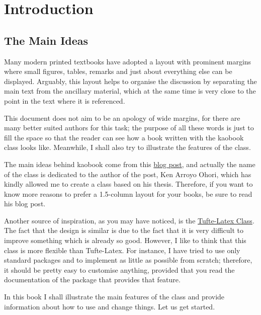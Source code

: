 \setchapterpreamble[u]{\margintoc}
\chapter{Introduction}

\section{The Main Ideas}

Many modern printed textbooks have adopted a layout with prominent
margins where small figures, tables, remarks and just about everything
else can be displayed. Arguably, this layout helps to organise the
	discussion by separating the main text from the ancillary material,
	which at the same time is very close to the point in the text where
	it is referenced.

This document does not aim to be an apology of wide margins, for there
are many better suited authors for this task; the purpose of all these
words is just to fill the space so that the reader can see how a book
written with the kaobook class looks like. Meanwhile, I shall also try
to illustrate the features of the class.

The main ideas behind kaobook come from this
\href{https://3d.bk.tudelft.nl/ken/en/2016/04/17/a-1.5-column-layout-in-latex.html}{blog
	post}, and actually the name of the class is dedicated to the author
of the post, Ken Arroyo Ohori, which has kindly allowed me to create a
class based on his thesis. Therefore, if you want to know more reasons
to prefer a 1.5-column layout for your books, be sure to read his blog
post.

Another source of inspiration, as you may have noticed, is the
\href{https://github.com/Tufte-LaTeX/tufte-latex}{Tufte-Latex Class}.
The fact that the design is similar is due to the fact that it is very
difficult to improve something which is already so good. However, I like
to think that this class is more flexible than Tufte-Latex. For
instance, I have tried to use only standard packages and to implement as
little as possible from scratch; therefore, it should be pretty easy
to customise anything, provided that you read the documentation of the
package that provides that feature.

In this book I shall illustrate the main features of the class and
provide information about how to use and change things. Let us get
started.

